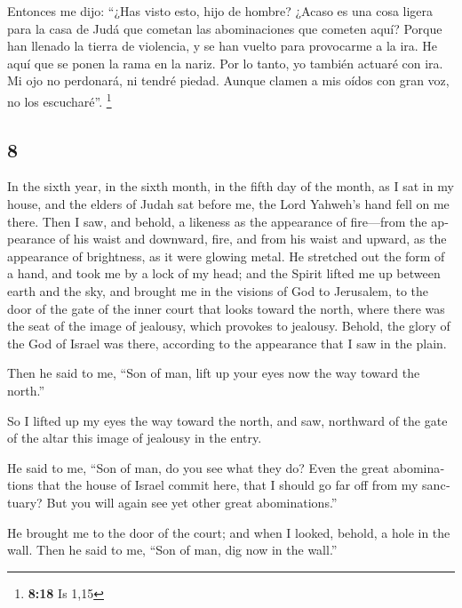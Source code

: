 \begin{paracol}{2}
 Entonces me dijo: ``¿Has visto esto, hijo de hombre?
¿Acaso es una cosa ligera para la casa de Judá que cometan las
abominaciones que cometen aquí? Porque han llenado la tierra de
violencia, y se han vuelto para provocarme a la ira. He aquí que se
ponen la rama en la nariz.  Por lo tanto, yo también
actuaré con ira. Mi ojo no perdonará, ni tendré piedad. Aunque clamen a
mis oídos con gran voz, no los escucharé''. \footnote{\textbf{8:18} Is
  1,15}

\switchcolumn
\begin{otherlanguage}{english}

\hypertarget{section-15}{%
\section{8}\label{section-15}}

 In the sixth year, in the sixth month, in the fifth day
of the month, as I sat in my house, and the elders of Judah sat before
me, the Lord Yahweh's hand fell on me there.  Then I saw,
and behold, a likeness as the appearance of fire---from the appearance
of his waist and downward, fire, and from his waist and upward, as the
appearance of brightness, as it were glowing metal.  He
stretched out the form of a hand, and took me by a lock of my head; and
the Spirit lifted me up between earth and the sky, and brought me in the
visions of God to Jerusalem, to the door of the gate of the inner court
that looks toward the north, where there was the seat of the image of
jealousy, which provokes to jealousy.  Behold, the glory
of the God of Israel was there, according to the appearance that I saw
in the plain.

 Then he said to me, ``Son of man, lift up your eyes now
the way toward the north.''

So I lifted up my eyes the way toward the north, and saw, northward of
the gate of the altar this image of jealousy in the entry.

 He said to me, ``Son of man, do you see what they do?
Even the great abominations that the house of Israel commit here, that I
should go far off from my sanctuary? But you will again see yet other
great abominations.''

 He brought me to the door of the court; and when I
looked, behold, a hole in the wall.  Then he said to me,
``Son of man, dig now in the wall.''


\end{otherlanguage}
\end{paracol}

